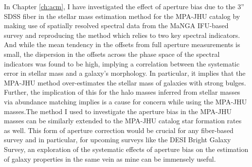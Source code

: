 In Chapter \ref{ch:acm}, I have investigated the effect of aperture bias due to the 3'' SDSS fiber in the stellar mass estimation method for the MPA-JHU catalog by making use of spatially resolved spectral data from the MaNGA IFU-based survey and reproducing the \citet{kauffmann_stellar_2003} method which relies to two key spectral indicators. And while the mean tendency in the offsets from full aperture measurements is small, the dispersion in the offsets across the phase space of the spectral indicators was found to be high, implying a correlation between the systematic error in stellar mass and a galaxy's morphology. In particular, it implies that the MPA-JHU method over-estimates the stellar mass of galaxies with strong bulges. Further, the implication of this for the halo masses inferred from stellar masses via abundance matching implies is a cause for concern while using the MPA-JHU masses.The method I used to investigate the aperture bias in the MPA-JHU masses can be similarly extended to the MPA-JHU catalog star formation rates as well. This form of aperture correction would be crucial for any fiber-based survey and in particular, for upcoming surveys like the DESI Bright Galaxy Survey, an exploration of the systematic effects of aperture bias on the estimation of galaxy properties in the same vein as mine can be immensely useful.\\

